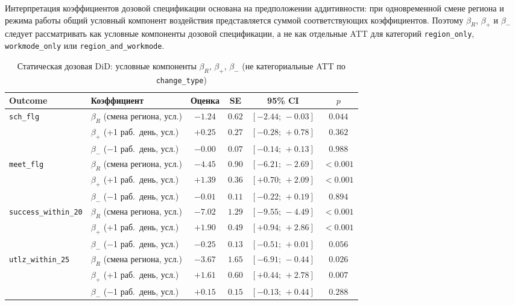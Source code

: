 \documentclass[14pt,a4paper]{extarticle}
\begin{document}
Интерпретация коэффициентов дозовой спецификации основана на предположении
аддитивности: при одновременной смене региона и режима работы общий условный
компонент воздействия представляется суммой соответствующих коэффициентов.
Поэтому \(\beta_R\), \(\beta_+\) и \(\beta_-\) следует рассматривать как
условные компоненты дозовой спецификации, а не как отдельные ATT для категорий
\texttt{region\_only}, \texttt{workmode\_only} или \texttt{region\_and\_workmode}.

\begin{table}[H]
\centering
\caption{Статическая дозовая DiD: условные компоненты \(\beta_R\), \(\beta_+\), \(\beta_-\)
(не категориальные ATT по \texttt{change\_type})}
\label{tab:dose_did_summary}
\footnotesize
\setlength{\tabcolsep}{3pt}
\renewcommand{\arraystretch}{1.15}
\begin{tabularx}{\textwidth}{@{}l l c c c c@{}}
\toprule
Outcome & Коэффициент & Оценка & SE & 95\% CI & \(p\) \\
\midrule
\texttt{sch\_flg} & $\beta_R$ (смена региона, усл.) & $-1.24$ & $0.62$ & $[-2.44;\,-0.03]$ & $0.044$ \\
 & $\beta_+$ (+1 раб.\ день, усл.) & $+0.25$ & $0.27$ & $[-0.28;\,+0.78]$ & $0.362$ \\
 & $\beta_-$ ($-$1 раб.\ день, усл.) & $-0.00$ & $0.07$ & $[-0.14;\,+0.13]$ & $0.988$ \\
\midrule
\texttt{meet\_flg} & $\beta_R$ (смена региона, усл.) & $-4.45$ & $0.90$ & $[-6.21;\,-2.69]$ & $<0.001$ \\
 & $\beta_+$ (+1 раб.\ день, усл.) & $+1.39$ & $0.36$ & $[+0.70;\,+2.09]$ & $<0.001$ \\
 & $\beta_-$ ($-$1 раб.\ день, усл.) & $-0.01$ & $0.11$ & $[-0.22;\,+0.19]$ & $0.894$ \\
\midrule
\texttt{success\_within\_20} & $\beta_R$ (смена региона, усл.) & $-7.02$ & $1.29$ & $[-9.55;\,-4.49]$ & $<0.001$ \\
 & $\beta_+$ (+1 раб.\ день, усл.) & $+1.90$ & $0.49$ & $[+0.94;\,+2.86]$ & $<0.001$ \\
 & $\beta_-$ ($-$1 раб.\ день, усл.) & $-0.25$ & $0.13$ & $[-0.51;\,+0.01]$ & $0.056$ \\
\midrule
\texttt{utlz\_within\_25} & $\beta_R$ (смена региона, усл.) & $-3.67$ & $1.65$ & $[-6.91;\,-0.44]$ & $0.026$ \\
 & $\beta_+$ (+1 раб.\ день, усл.) & $+1.61$ & $0.60$ & $[+0.44;\,+2.78]$ & $0.007$ \\
 & $\beta_-$ ($-$1 раб.\ день, усл.) & $+0.15$ & $0.15$ & $[-0.13;\,+0.44]$ & $0.288$ \\

\end{tabularx}
\end{table}
\end{document}
